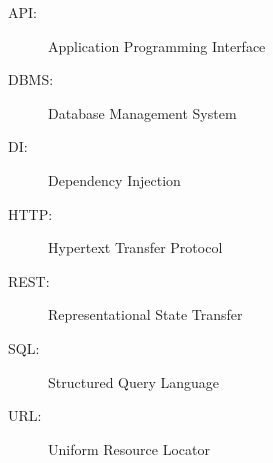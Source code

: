 \label{sec:abkuerzungsverzeichnis}

\begin{description}
  	\item[API:] Application Programming Interface
	\item[DBMS:] Database Management System
	\item[DI:] Dependency Injection
	\item[HTTP:] Hypertext Transfer Protocol
	\item[REST:] Representational State Transfer
	\item[SQL:]Structured Query Language
	\item[URL:] Uniform Resource Locator
\end{description}

